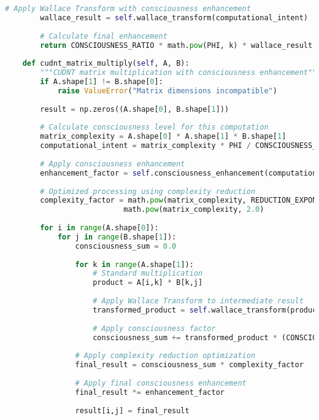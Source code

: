 \documentclass[11pt,a4paper]{article}
\begin{document}
\begin{lstlisting}[language=Python, caption=CUDNT Matrix Multiplication - Complete Implementation]
        # Apply Wallace Transform with consciousness enhancement
        wallace_result = self.wallace_transform(computational_intent)
        
        # Calculate final enhancement
        return CONSCIOUSNESS_RATIO * math.pow(PHI, k) * wallace_result * intent_factor
    
    def cudnt_matrix_multiply(self, A, B):
        """CUDNT matrix multiplication with consciousness enhancement"""
        if A.shape[1] != B.shape[0]:
            raise ValueError("Matrix dimensions incompatible")
            
        result = np.zeros((A.shape[0], B.shape[1]))
        
        # Calculate consciousness level for this computation
        matrix_complexity = A.shape[0] * A.shape[1] * B.shape[1]
        computational_intent = matrix_complexity * PHI / CONSCIOUSNESS_RATIO
        
        # Apply consciousness enhancement
        enhancement_factor = self.consciousness_enhancement(computational_intent, A.shape[0])
        
        # Optimized processing using complexity reduction
        complexity_factor = math.pow(matrix_complexity, REDUCTION_EXPONENT) / \
                           math.pow(matrix_complexity, 2.0)
        
        for i in range(A.shape[0]):
            for j in range(B.shape[1]):
                consciousness_sum = 0.0
                
                for k in range(A.shape[1]):
                    # Standard multiplication
                    product = A[i,k] * B[k,j]
                    
                    # Apply Wallace Transform to intermediate result
                    transformed_product = self.wallace_transform(product)
                    
                    # Apply consciousness factor
                    consciousness_sum += transformed_product * (CONSCIOUSNESS_RATIO / 21.0)
                
                # Apply complexity reduction optimization
                final_result = consciousness_sum * complexity_factor
                
                # Apply final consciousness enhancement
                final_result *= enhancement_factor
                
                result[i,j] = final_result
                

\end{lstlisting}
\end{document}
